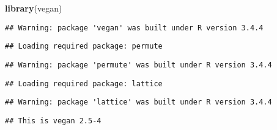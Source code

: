 \documentclass[]{article}
\newenvironment{Shaded}{\begin{snugshade}}{\end{snugshade}}
\newcommand{\KeywordTok}[1]{\textcolor[rgb]{0.13,0.29,0.53}{\textbf{#1}}}
\newcommand{\NormalTok}[1]{#1}
\begin{document}
\begin{Shaded}
\begin{Highlighting}[]
\KeywordTok{library}\NormalTok{(vegan)}
\end{Highlighting}
\end{Shaded}

\begin{verbatim}
## Warning: package 'vegan' was built under R version 3.4.4
\end{verbatim}

\begin{verbatim}
## Loading required package: permute
\end{verbatim}

\begin{verbatim}
## Warning: package 'permute' was built under R version 3.4.4
\end{verbatim}

\begin{verbatim}
## Loading required package: lattice
\end{verbatim}

\begin{verbatim}
## Warning: package 'lattice' was built under R version 3.4.4
\end{verbatim}

\begin{verbatim}
## This is vegan 2.5-4
\end{verbatim}
\end{document}

